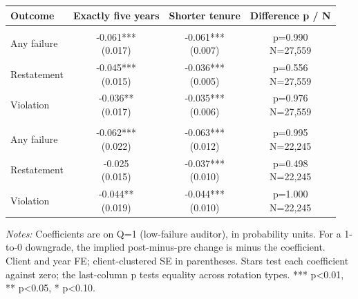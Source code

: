 \documentclass[10pt]{article}
\begin{document}
\begin{minipage}{19cm}\fontsize{10}{12}\selectfont\setlength{\tabcolsep}{4pt}\renewcommand{\arraystretch}{1.12}


\centering
{}
\begin{threeparttable}
\begin{tabular}{p{}ccc}
\toprule
Outcome & Exactly five years & Shorter tenure & Difference p / N \\
\midrule
\addlinespace
\multicolumn{4}{l}{\textbf{Panel A: Upgrade}} \\
Any failure & \shortstack{-0.061***\\(0.017)} & \shortstack{-0.061***\\(0.007)} & \shortstack{p=0.990\\N=27,559} \\
Restatement & \shortstack{-0.045***\\(0.015)} & \shortstack{-0.036***\\(0.005)} & \shortstack{p=0.556\\N=27,559} \\
Violation & \shortstack{-0.036**\\(0.017)} & \shortstack{-0.035***\\(0.006)} & \shortstack{p=0.976\\N=27,559} \\
\addlinespace
\multicolumn{4}{l}{\textbf{Panel B: Downgrade}} \\
Any failure & \shortstack{-0.062***\\(0.022)} & \shortstack{-0.063***\\(0.012)} & \shortstack{p=0.995\\N=22,245} \\
Restatement & \shortstack{-0.025\\(0.015)} & \shortstack{-0.037***\\(0.010)} & \shortstack{p=0.498\\N=22,245} \\
Violation & \shortstack{-0.044**\\(0.019)} & \shortstack{-0.044***\\(0.010)} & \shortstack{p=1.000\\N=22,245} \\
\bottomrule
\end{tabular}
\begin{tablenotes}\fontsize{9}{11}\selectfont
\item \raggedright \fontsize{9}{11}\selectfont \textit{Notes:} Coefficients are on Q=1 (low-failure auditor), in probability units. For a 1-to-0 downgrade, the implied post-minus-pre change is minus the coefficient. Client and year FE; client-clustered SE in parentheses. Stars test each coefficient against zero; the last-column p tests equality across rotation types. *** p<0.01, ** p<0.05, * p<0.10.
\end{tablenotes}
\end{threeparttable}

\end{minipage}
\end{document}
